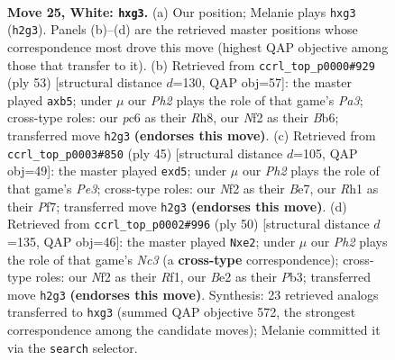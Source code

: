 \documentclass[11pt]{article}
\begin{document}
\clearpage

\begin{figure}[p]\centering
\begin{subfigure}{0.46\textwidth}\centering
\resizebox{\linewidth}{!}{%
\newchessgame
\chessboard[
  setfen={rnb3kr/3n4/2p5/pp1N4/8/6q1/PPP1BN1P/1K1R3R w - - 0 25},
  showmover=false,
  pgfstyle=straightmove, color=movearrow, markmove={h2-g3}
]}
\caption{}
\end{subfigure}\hfill
\begin{subfigure}{0.46\textwidth}\centering
\resizebox{\linewidth}{!}{%
\newchessgame
\chessboard[
  setfen={2k3rr/1p6/pbp1p1np/1Q2P3/5PP1/PP4B1/4N3/R3K2R b KQ - 0 27},
  showmover=false,
  pgfstyle=straightmove, color=movearrow, markmove={a6-b5}
]}
\caption{}
\end{subfigure}
\\[4pt]
\begin{subfigure}{0.46\textwidth}\centering
\resizebox{\linewidth}{!}{%
\newchessgame
\chessboard[
  setfen={2r2rk1/4bp1p/4p1pP/1p1Q4/3P4/4RN2/1PnB1PP1/R5K1 b - - 0 23},
  showmover=false,
  pgfstyle=straightmove, color=movearrow, markmove={e6-d5}
]}
\caption{}
\end{subfigure}\hfill
\begin{subfigure}{0.46\textwidth}\centering
\resizebox{\linewidth}{!}{%
\newchessgame
\chessboard[
  setfen={2r3k1/pp3rp1/5n1p/8/5P2/1PN4P/P3q1P1/2R2R1K w - - 0 26},
  showmover=false,
  pgfstyle=straightmove, color=movearrow, markmove={c3-e2}
]}
\caption{}
\end{subfigure}
\caption{\textbf{Move 25, White: \texttt{hxg3}.} (a) Our position; Melanie plays \texttt{hxg3} (\texttt{h2g3}). Panels (b)--(d) are the retrieved master positions whose correspondence most drove this move (highest QAP objective among those that transfer to it). (b) Retrieved from \texttt{ccrl\_top\_p0000\#929} (ply 53) [structural distance $d$=130, QAP obj=57]: the master played \texttt{axb5}; under $\mu$ our \emph{Ph2} plays the role of that game's \emph{Pa3}; cross-type roles: our \emph{p}c6 as their \emph{R}h8, our \emph{N}f2 as their \emph{B}b6; transferred move \texttt{h2g3} \textbf{(endorses this move)}. (c) Retrieved from \texttt{ccrl\_top\_p0003\#850} (ply 45) [structural distance $d$=105, QAP obj=49]: the master played \texttt{exd5}; under $\mu$ our \emph{Ph2} plays the role of that game's \emph{Pe3}; cross-type roles: our \emph{N}f2 as their \emph{B}e7, our \emph{R}h1 as their \emph{P}f7; transferred move \texttt{h2g3} \textbf{(endorses this move)}. (d) Retrieved from \texttt{ccrl\_top\_p0002\#996} (ply 50) [structural distance $d$=135, QAP obj=46]: the master played \texttt{Nxe2}; under $\mu$ our \emph{Ph2} plays the role of that game's \emph{Nc3} (a \textbf{cross-type} correspondence); cross-type roles: our \emph{N}f2 as their \emph{R}f1, our \emph{B}e2 as their \emph{P}b3; transferred move \texttt{h2g3} \textbf{(endorses this move)}. Synthesis: 23 retrieved analogs transferred to \texttt{hxg3} (summed QAP objective 572, the strongest correspondence among the candidate moves); Melanie committed it via the \texttt{search} selector.}
\label{fig:thought-m48}
\end{figure}
\end{document}
